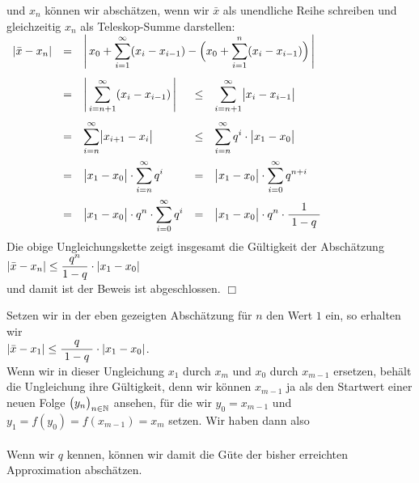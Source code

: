 und $x_n$ k\"onnen wir absch\"atzen, wenn wir $\bar{x}$ als unendliche Reihe schreiben und gleichzeitig
$x_n$ als Teleskop-Summe darstellen: 
\\[0.2cm]
\hspace*{1.3cm}
$
\begin{array}[t]{lclcl}
       |\bar{x} - x_n| 
& = & \multicolumn{3}{l}{\ds\left|\, x_0 + \sum\limits_{i=1}^\infty (x_i - x_{i-1}) - \Bigl(x_0 + \sum\limits_{i=1}^n (x_i - x_{i-1}) \Bigr) \,\right|} \\[0.6cm]
& = & \ds \left|\, \sum\limits_{i=n+1}^\infty (x_i - x_{i-1}) \,\right| & \leq & \ds\sum\limits_{i=n+1}^\infty \bigl|x_i - x_{i-1}\bigr| \\[0.6cm]
& = & \ds \sum\limits_{i=n}^\infty \bigl|x_{i+1} - x_{i}\bigr| & \leq & \ds\sum\limits_{i=n}^\infty q^i \cdot  \bigl|x_1 - x_0\bigr| \\[0.5cm]
& = & \ds \bigl|x_1 - x_0\bigr| \cdot  \sum\limits_{i=n}^\infty q^i & = & \ds\bigl|x_1 - x_0\bigr| \cdot  \sum\limits_{i=0}^\infty q^{n+i} \\[0.5cm]
& = & \ds \bigl|x_1 - x_0\bigr| \cdot  q^{n} \cdot  \sum\limits_{i=0}^\infty q^i & = & \ds\bigl|x_1 - x_0\bigr| \cdot  q^{n} \cdot  \bruch{1}{1 - q} \\[0.5cm]
\end{array}
$
\\[0.2cm]
Die obige Ungleichungskette zeigt insgesamt die G\"ultigkeit der Absch\"atzung 
\\[0.2cm]
\hspace*{1.3cm}
$\displaystyle|\bar{x} - x_n| \leq \frac{q^n}{1 - q} \cdot  |x_1 - x_0|$
\\[0.2cm]
und damit ist der Beweis ist abgeschlossen. \hspace*{\fill} $\Box$
\vspace*{0.3cm}

Setzen wir in der eben gezeigten Absch\"atzung f\"ur  $n$ den Wert $1$ ein, so erhalten wir 
\\[0.2cm]
\hspace*{1.3cm}
$|\bar{x} - x_1| \leq \displaystyle\frac{\;\displaystyle q\;}{\;\displaystyle1 - q\;} \cdot |x_1 - x_0|$. 
\\[0.2cm]
Wenn wir in dieser Ungleichung $x_1$ durch $x_{m}$ und $x_0$ durch $x_{m-1}$ ersetzen,
beh\"alt die Ungleichung ihre G\"ultigkeit, denn wir k\"onnen $x_{m-1}$  ja als den
Startwert einer neuen Folge $\bigl(y_n\bigr)_{n\in\mathbb{N}}$ ansehen, f\"ur die wir $y_0 = x_{m-1}$ und 
$y_1 = f(y_0) = f(x_{m-1}) = x_{m}$ setzen.  Wir haben dann also 
\\[0.2cm]
\hspace*{1.3cm}
\colorbox{red}{\colorbox{orange}{}}
\\[0.2cm]
Wenn wir $q$ kennen, k\"onnen wir damit die G\"ute der bisher erreichten Approximation
absch\"atzen.

